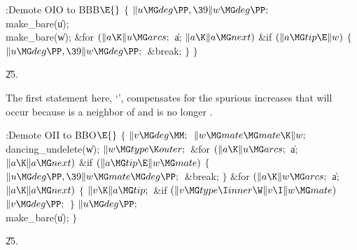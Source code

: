 \B{}:Demote OIO to BBB\X${}\E{}$\6
${}\{{}$\1\6
${}\|u\MG\\{deg}\PP,\39\|w\MG\\{deg}\PP;{}$\6
\\{make\_bare}(\|u);\6
\\{make\_bare}(\|w);\6
\&{for} ${}(\|a\K\|u\MG\\{arcs};{}$ \|a; ${}\|a\K\|a\MG\\{next}){}$\1\6
\&{if} ${}(\|a\MG\\{tip}\E\|w){}$\5
${}\{{}$\1\6
${}\|u\MG\\{deg}\PP,\39\|w\MG\\{deg}\PP;{}$\6
\&{break};\6
\4${}\}{}$\2\2\6
\4${}\}{}$\2\par
\U25.\fi

The first statement here, `',
compensates for the spurious
increases that will occur because  is a neighbor of  and 
is no longer .

\Y\B\4:Demote OII to BBO\X${}\E{}$\6
${}\{{}$\1\6
${}\|v\MG\\{deg}\MM;{}$\6
${}\|w\MG\\{mate}\MG\\{mate}\K\|w;{}$\6
\\{dancing\_undelete}(\|w);\6
${}\|w\MG\\{type}\K\\{outer};{}$\6
\&{for} ${}(\|a\K\|u\MG\\{arcs};{}$ \|a; ${}\|a\K\|a\MG\\{next}){}$\1\6
\&{if} ${}(\|a\MG\\{tip}\E\|w\MG\\{mate}){}$\5
${}\{{}$\1\6
${}\|u\MG\\{deg}\PP,\39\|w\MG\\{mate}\MG\\{deg}\PP;{}$\6
\&{break};\6
\4${}\}{}$\2\2\6
\&{for} ${}(\|a\K\|w\MG\\{arcs};{}$ \|a; ${}\|a\K\|a\MG\\{next}){}$\5
${}\{{}$\1\6
${}\|v\K\|a\MG\\{tip};{}$\6
\&{if} ${}(\|v\MG\\{type}\I\\{inner}\W\|v\I\|w\MG\\{mate}){}$\1\5
${}\|v\MG\\{deg}\PP;{}$\2\6
\4${}\}{}$\2\6
${}\|u\MG\\{deg}\PP;{}$\6
\\{make\_bare}(\|u);\6
\4${}\}{}$\2\par
\U25.\fi

